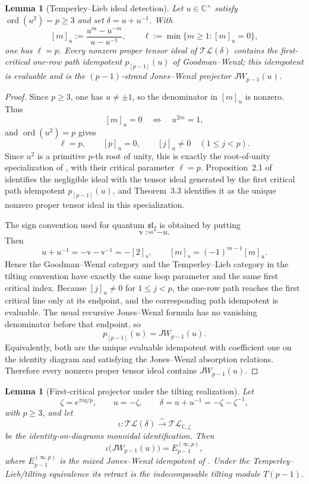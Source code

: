 \documentclass[12pt,leqno]{amsart}
\numberwithin{equation}{section}
\newtheorem{lem}[thm]{Lemma}
\newcommand{\TL}{\mathcal{TL}}
\def\C{\mathbb{C}}
\begin{document}
\begin{lem}[Temperley--Lieb ideal detection]\label{lem:TL-ideal-detection}
Let $u\in\C^\times$ satisfy $\operatorname{ord}(u^2)=p\ge3$ and set
$\delta=u+u^{-1}$.  With
\[
 [m]_u:=\frac{u^m-u^{-m}}{u-u^{-1}},\qquad
 \ell:=\min\{m\ge1:[m]_u=0\},
\]
one has $\ell=p$.  Every nonzero proper tensor ideal of $\TL(\delta)$
contains the first-critical one-row path idempotent
$p_{[p-1]}(u)$ of Goodman--Wenzl; this idempotent is evaluable and is
the $(p-1)$-strand Jones--Wenzl projector $JW_{p-1}(u)$.
\end{lem}

\begin{proof}
Since $p\ge3$, one has $u\ne\pm1$, so the denominator in $[m]_u$ is
nonzero.  Thus
\[
 [m]_u=0\quad\Longleftrightarrow\quad u^{2m}=1,
\]
and $\operatorname{ord}(u^2)=p$ gives
\[
 \ell=p,\qquad [p]_u=0,\qquad [j]_u\ne0\quad(1\le j<p).
\]
Since $u^2$ is a primitive $p$-th root of unity, this is exactly the
root-of-unity specialization of \cite[Section~2.4]{GoodmanWenzl}, with
their critical parameter $\ell=p$.  Proposition~2.1 of
\cite{GoodmanWenzl} identifies the negligible ideal with the tensor
ideal generated by the first critical path idempotent
$p_{[p-1]}(u)$, and Theorem~3.3 identifies it as the unique nonzero
proper tensor ideal in this specialization.

The sign convention used for quantum $\mathfrak{sl}_2$ is obtained by
putting
\[
 \mathbb v:=-u.
\]
Then
\[
 u+u^{-1}=-\mathbb v-\mathbb v^{-1}=-[2]_{\mathbb v},
 \qquad
 [m]_{\mathbb v}=(-1)^{m-1}[m]_u.
\]
Hence the Goodman--Wenzl category and the Temperley--Lieb category in
the tilting convention have exactly the same loop parameter and the
same first critical index.  Because $[j]_u\ne0$ for $1\le j<p$, the
one-row path reaches the first critical line only at its endpoint, and
the corresponding path idempotent is evaluable.  The usual recursive
Jones--Wenzl formula has no vanishing denominator before that endpoint,
so
\[
 p_{[p-1]}(u)=JW_{p-1}(u).
\]
Equivalently, both are the unique evaluable idempotent with coefficient
one on the identity diagram and satisfying the Jones--Wenzl absorption
relations.  Therefore every nonzero proper tensor ideal contains
$JW_{p-1}(u)$.
\end{proof}



\begin{lem}[First-critical projector under the tilting realization]
\label{lem:first-critical-tilting-projector}
Let
\[
 \zeta=e^{\pi iq/p},\qquad u=-\zeta,\qquad
 \delta=u+u^{-1}=-\zeta-\zeta^{-1},
\]
with $p\ge3$, and let
\[
 \iota:\TL(\delta)\xrightarrow{\sim}\TL_{\C,\zeta}
\]
be the identity-on-diagrams monoidal identification.  Then
\[
 \iota\bigl(JW_{p-1}(u)\bigr)=E_{p-1}^{(\infty,p)},
\]
where $E_{p-1}^{(\infty,p)}$ is the mixed Jones--Wenzl idempotent of
\cite{SuttonTubbenhauerWedrichZhu}.  Under the
Temperley--Lieb/tilting equivalence its retract is the indecomposable
tilting module $T(p-1)$.
\end{lem}
\end{document}
